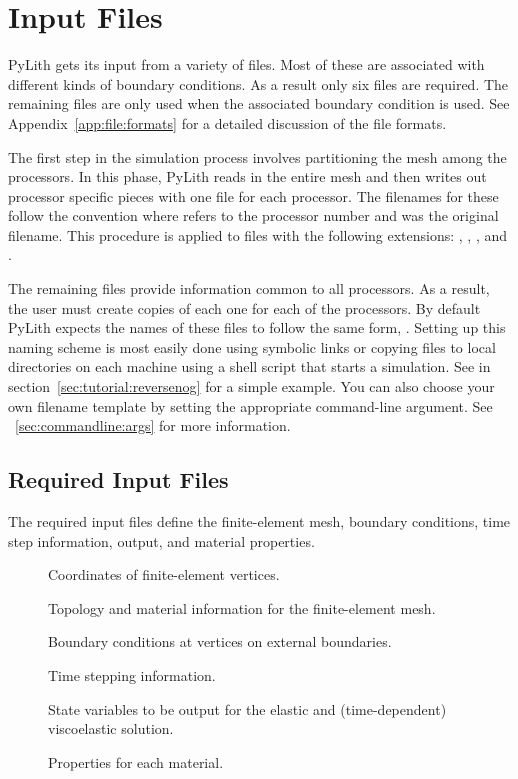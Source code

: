 \section{Input Files}

PyLith gets its input from a variety of files. Most of these are
associated with different kinds of boundary conditions. As a result
only six files are required. The remaining files are only used when
the associated boundary condition is used. See
Appendix~\ref{app:file:formats} for a detailed discussion of the file
formats.

The first step in the simulation process involves partitioning the
mesh among the processors. In this phase, PyLith reads in the entire
mesh and then writes out processor specific pieces with one file for
each processor. The filenames for these follow the convention
 where 
refers to the processor number and  was the
original filename. This procedure is applied to files with the
following extensions: ,
, , and
.

The remaining files provide information common to all processors. As a
result, the user must create copies of each one for each of the
processors. By default PyLith expects the names of these files to
follow the same form, . Setting up this naming
scheme is most easily done using symbolic links or copying files to
local directories on each machine using a shell script that starts a
simulation. See  in
section~\ref{sec:tutorial:reversenog} for a simple example. You can
also choose your own filename template by setting the appropriate
command-line argument. See ~\ref{sec:commandline:args} for more
information.


\subsection{Required Input Files}

The required input files define the finite-element mesh, boundary
conditions, time step information, output, and material properties.

\begin{description}
\item[] Coordinates of finite-element vertices.
\item[] Topology and material information for
  the finite-element mesh.
\item[] Boundary conditions at vertices on external
  boundaries.
\item[] Time stepping information.
\item[] State variables to be output for the
  elastic and (time-dependent) viscoelastic solution.
\item[] Properties for each material.
\end{description}


